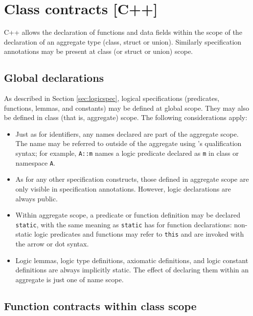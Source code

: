 \section{Class contracts [C++]}
\label{sec:class-contracts}

C++ allows the declaration of functions and data fields within
the scope of the declaration of an aggregate type (class, struct or union). Similarly \NAME specification annotations
may be present at class (or struct or union) scope.

\subsection{Global declarations}

As described in Section \ref{sec:logicspec}, logical specifications (predicates, functions, lemmas, and constants) may be defined at global scope. They may also be defined in class (that is, aggregate) scope. The following considerations apply:
\begin{itemize}
	\item Just as for \lang identifiers, any names 
	declared are part of the aggregate scope. The name may
	be referred to outside of the aggregate using \lang's 
	qualification syntax; for example, \lstinline|A::m| names a 
	logic predicate declared as \lstinline|m| in class
	or namespace \lstinline|A|.
	\item As for any other specification constructs, those defined in aggregate scope are only visible in specification annotations. However, logic declarations are always public.
	\item Within aggregate scope, a predicate or function definition may be
	declared \lstinline|static|, with the same meaning as 
	\lstinline|static| has for \lang function 
	declarations: non-static logic predicates and functions
	may refer to \lstinline|this| and are invoked with the
	\lang arrow or dot syntax.

	\item Logic lemmas, logic type definitions, axiomatic definitions, and logic constant definitions are always implicitly static. The effect of declaring them within an aggregate is just one of name scope.
\end{itemize}


\subsection{Function contracts within class scope}

